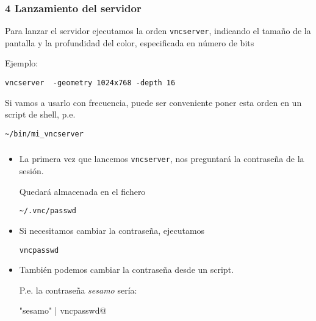 \documentclass[ucs]{beamer}
\begin{document}
\begin{frame}[fragile]
\frametitle{4 Lanzamiento del servidor}

Para lanzar el servidor ejecutamos la orden \verb|vncserver|, indicando
el tamaño de la pantalla y la profundidad del color, especificada en número
de bits

Ejemplo:

\verb|vncserver  -geometry 1024x768 -depth 16|

Si vamos a usarlo con frecuencia, puede ser conveniente poner esta
orden en un script de shell, p.e.

\verb|~/bin/mi_vncserver|
\end{frame}


\begin{frame}[fragile]
\frametitle{}
\begin{itemize}
\item
La primera vez que lancemos 
\verb|vncserver|, nos preguntará
la contraseña de la sesión.

Quedará almacenada en el fichero

\verb|~/.vnc/passwd|
\item
Si necesitamos cambiar la contraseña, ejecutamos

\verb|vncpasswd|

\item
También podemos cambiar la contraseña desde un script.

P.e. la contraseña \emph{sesamo} sería:

\verb@echo "sesamo\nsesamo\n\n" | vncpasswd@

\end{itemize}

\end{frame}
\end{document}
